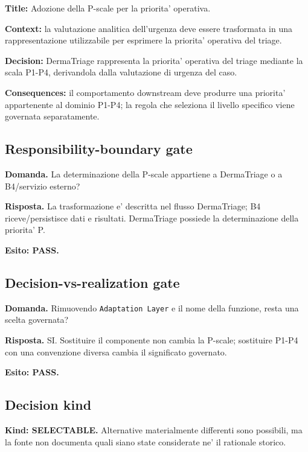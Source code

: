 \documentclass[11pt,a4paper]{article}
\begin{document}
\begin{ddtacore}[title={DEC-02 dopo REWORK}]
\textbf{Title:} Adozione della P-scale per la priorita' operativa.\par
\textbf{Context:} la valutazione analitica dell'urgenza deve essere trasformata in una rappresentazione utilizzabile per esprimere la priorita' operativa del triage.\par
\textbf{Decision:} DermaTriage rappresenta la priorita' operativa del triage mediante la scala P1-P4, derivandola dalla valutazione di urgenza del caso.\par
\textbf{Consequences:} il comportamento downstream deve produrre una priorita' appartenente al dominio P1-P4; la regola che seleziona il livello specifico viene governata separatamente.
\end{ddtacore}

\subsection{Responsibility-boundary gate}
\begin{ddtacheck}
\textbf{Domanda.} La determinazione della P-scale appartiene a DermaTriage o a B4/servizio esterno?
\end{ddtacheck}
\textbf{Risposta.} La trasformazione e' descritta nel flusso DermaTriage; B4 riceve/persistisce dati e risultati. DermaTriage possiede la determinazione della priorita' P.\par
\textbf{Esito: PASS.}

\subsection{Decision-vs-realization gate}
\begin{ddtacheck}
\textbf{Domanda.} Rimuovendo \texttt{Adaptation Layer} e il nome della funzione, resta una scelta governata?
\end{ddtacheck}
\textbf{Risposta.} SI. Sostituire il componente non cambia la P-scale; sostituire P1-P4 con una convenzione diversa cambia il significato governato.\par
\textbf{Esito: PASS.}

\subsection{Decision kind}
\textbf{Kind: SELECTABLE.} Alternative materialmente differenti sono possibili, ma la fonte non documenta quali siano state considerate ne' il rationale storico.
\end{document}
